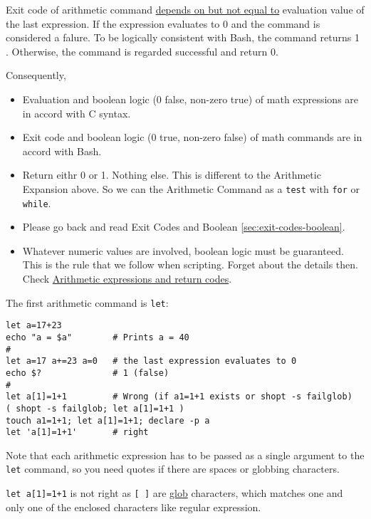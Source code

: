 Exit code of arithmetic command \uline{depends on but not equal
  to} evaluation value of the last expression. If the
expression evaluates to 0 and the command is considered a falure. To
be logically consistent with Bash, the command returns 1
. Otherwise, the command is regarded successful and return
0.

Consequently,

\begin{itemize}
\item Evaluation and boolean logic (0 false, non-zero true) of
  math expressions are in accord with C syntax.
\item Exit code and boolean logic (0 true, non-zero false) of math
  commands are in accord with Bash.
\item Return eithr 0 or 1. Nothing else. This is different to the
  Arithmetic Expansion above. So we can the Arithmetic Command as
  a \lstinline|test| with \lstinline|for| or \lstinline|while|.
\item Please go back and read Exit Codes and Boolean
  \ref{sec:exit-codes-boolean}.
\item Whatever numeric values are involved, boolean logic must be
  guaranteed. This is the rule that we follow when
  scripting. Forget about the details then. Check
  \href{https://wiki.bash-hackers.org/syntax/arith_expr#arithmetic_expressions_and_return_codes}{Arithmetic
    expressions and return codes}.
\end{itemize}

The first arithmetic command is \lstinline|let|:

\begin{minipage}{1.0\linewidth}
\begin{lstlisting}
let a=17+23
echo "a = $a"        # Prints a = 40
#
let a=17 a+=23 a=0   # the last expression evaluates to 0
echo $?              # 1 (false)
#
let a[1]=1+1         # Wrong (if a1=1+1 exists or shopt -s failglob)
( shopt -s failglob; let a[1]=1+1 )
touch a1=1+1; let a[1]=1+1; declare -p a
let 'a[1]=1+1'       # right
\end{lstlisting}
\end{minipage}

Note that each arithmetic expression has to be passed as a single
argument to the \lstinline|let| command, so you need quotes if
there are spaces or globbing characters.

\lstinline/let a[1]=1+1/ is not right as \lstinline|[ ]| are
\href{http://mywiki.wooledge.org/glob}{glob} characters, which
matches one and only one of the enclosed characters like regular
expression.

